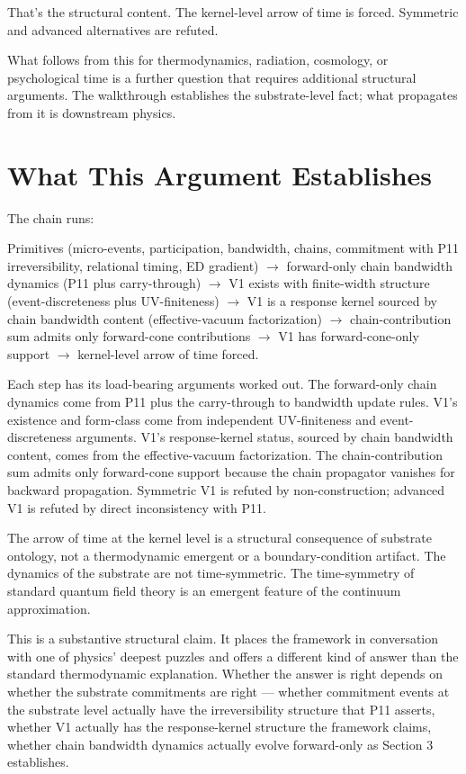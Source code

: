 \documentclass[11pt,a4paper]{article}
\begin{document}
That's the structural content. The kernel-level arrow of time is forced. Symmetric and advanced alternatives are refuted.

What follows from this for thermodynamics, radiation, cosmology, or psychological time is a further question that requires additional structural arguments. The walkthrough establishes the substrate-level fact; what propagates from it is downstream physics.

\section{What This Argument Establishes}

The chain runs:

Primitives (micro-events, participation, bandwidth, chains, commitment with P11 irreversibility, relational timing, ED gradient) $\to$ forward-only chain bandwidth dynamics (P11 plus carry-through) $\to$ V1 exists with finite-width structure (event-discreteness plus UV-finiteness) $\to$ V1 is a response kernel sourced by chain bandwidth content (effective-vacuum factorization) $\to$ chain-contribution sum admits only forward-cone contributions $\to$ V1 has forward-cone-only support $\to$ kernel-level arrow of time forced.

Each step has its load-bearing arguments worked out. The forward-only chain dynamics come from P11 plus the carry-through to bandwidth update rules. V1's existence and form-class come from independent UV-finiteness and event-discreteness arguments. V1's response-kernel status, sourced by chain bandwidth content, comes from the effective-vacuum factorization. The chain-contribution sum admits only forward-cone support because the chain propagator vanishes for backward propagation. Symmetric V1 is refuted by non-construction; advanced V1 is refuted by direct inconsistency with P11.

The arrow of time at the kernel level is a structural consequence of substrate ontology, not a thermodynamic emergent or a boundary-condition artifact. The dynamics of the substrate are not time-symmetric. The time-symmetry of standard quantum field theory is an emergent feature of the continuum approximation.

This is a substantive structural claim. It places the framework in conversation with one of physics' deepest puzzles and offers a different kind of answer than the standard thermodynamic explanation. Whether the answer is right depends on whether the substrate commitments are right --- whether commitment events at the substrate level actually have the irreversibility structure that P11 asserts, whether V1 actually has the response-kernel structure the framework claims, whether chain bandwidth dynamics actually evolve forward-only as Section 3 establishes.
\end{document}
